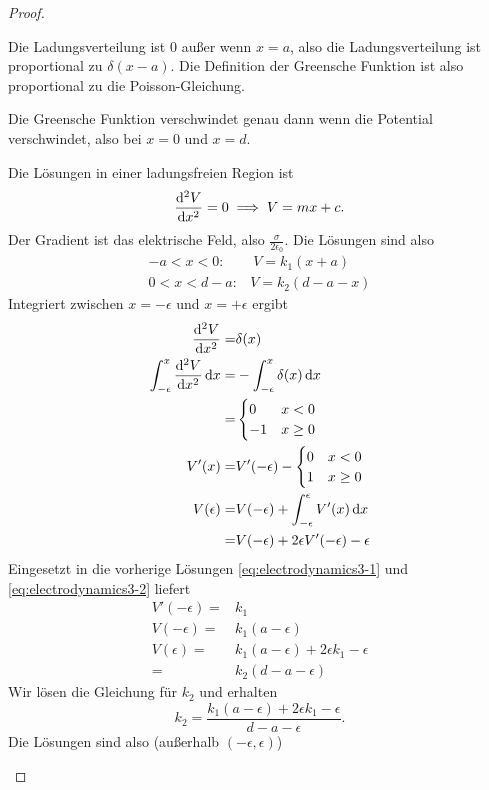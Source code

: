 \begin{proof}
	\begin{parts}
	\item Die Ladungsverteilung ist 0 außer wenn $x=a$, also die Ladungsverteilung ist proportional zu $\delta(x-a)$. Die Definition der Greensche Funktion ist also proportional zu die Poisson-Gleichung.
	
		Die Greensche Funktion verschwindet genau dann wenn die Potential verschwindet, also bei $x=0$ und $x=d$.
	\item Die Lösungen in einer ladungsfreien Region ist
		\[
		\dv[2]{V}{x}=0\implies V = m x + c
		.\] 
		Der Gradient ist das elektrische Feld, also $\frac{\sigma}{2\epsilon_0}$. Die Lösungen sind also
		\begin{align}
			-a<x<0:&~V = k_1(x+a)\label{eq:electrodynamics3-1}\\
			0<x<d-a:&V= k_2(d-a-x)\label{eq:electrodynamics3-2}
		\end{align}
		Integriert zwischen $x=-\epsilon$ und $x=+\epsilon$ ergibt
\begin{align*}
	\dv[2]{V}{x}=& \delta(x)\\
	\int_{-\epsilon}^x \dv[2]{V}{x}\dd{x}=& -\int_{-\epsilon}^{x} \delta(x)\dd{x}\\
	=& \begin{cases}
		0 & x < 0\\ 
		-1 & x \ge 0
	\end{cases}\\
		V'(x)=&V'(-\epsilon) - \begin{cases}
		0 & x < 0\\
		1 & x \ge 0
	\end{cases}\\
			V(\epsilon) =& V(-\epsilon) + \int_{-\epsilon}^\epsilon V'(x)\dd{x}\\
			=& V(-\epsilon) + 2\epsilon V'(-\epsilon) - \epsilon
\end{align*}
Eingesetzt in die vorherige Lösungen \eqref{eq:electrodynamics3-1} und \eqref{eq:electrodynamics3-2} liefert
\begin{align*}
	V'(-\epsilon) =& k_1\\
	V(-\epsilon) =& k_1 (a-\epsilon)\\
	V(\epsilon) =& k_1(a-\epsilon)+2\epsilon k_1 - \epsilon\\
	=&k_2(d-a-\epsilon) 
\end{align*}
Wir lösen die Gleichung für $k_2$ und erhalten
\[
k_2= \frac{k_1(a-\epsilon) + 2\epsilon k_1-\epsilon}{d-a-\epsilon}
.\] 
Die Lösungen sind also (außerhalb $(-\epsilon,\epsilon)$)

\end{parts}
\end{proof}
